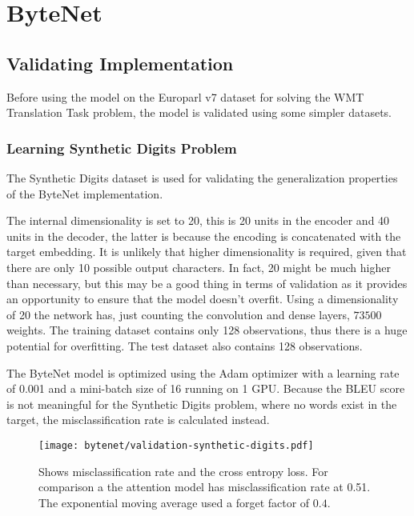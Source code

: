 
\section{ByteNet}

\subsection{Validating Implementation}

Before using the model on the Europarl v7 dataset for solving the WMT Translation Task problem, the model is validated using some simpler datasets.

\subsubsection{Learning Synthetic Digits Problem}

The Synthetic Digits dataset is used for validating the generalization properties of the ByteNet implementation.

The internal dimensionality is set to 20, this is 20 units in the encoder and 40 units in the decoder, the latter is because the encoding is concatenated with the target embedding. It is unlikely that higher dimensionality is required, given that there are only 10 possible output characters. In fact, 20 might be much higher than necessary, but this may be a good thing in terms of validation as it provides an opportunity to ensure that the model doesn't overfit. Using a dimensionality of 20 the network has, just counting the convolution and dense layers, $73500$ weights. The training dataset contains only 128 observations, thus there is a huge potential for overfitting. The test dataset also contains 128 observations.

The ByteNet model is optimized using the Adam optimizer with a learning rate of 0.001 and a mini-batch size of 16 running on 1 GPU. Because the BLEU score is not meaningful for the Synthetic Digits problem, where no words exist in the target, the misclassification rate is calculated instead.

\begin{figure}[h]
    \centering
    \texttt{[image: bytenet/validation-synthetic-digits.pdf]}
    \caption{Shows misclassification rate and the cross entropy loss. For comparison a the attention model has misclassification rate at 0.51. The exponential moving average used a forget factor of $0.4$.}
    \label{fig:result:bytenet:digits}
\end{figure}

